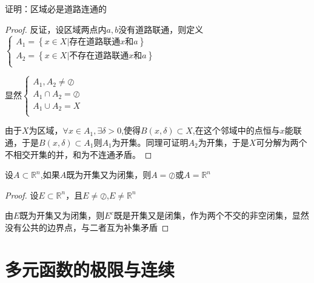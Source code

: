 \documentclass[lang=cn,10pt]{elegantbook}
\begin{document}
\begin{exercise}
	证明：区域必是道路连通的
\end{exercise}
\begin{proof}
	反证，设区域两点内$a,b$没有道路联通，则定义
	$\begin{cases}
		A_1=\left\{ x\in X|\text{存在道路联通}x\text{和}a \right\}\\
		A_2=\left\{ x\in X|\text{不存在道路联通}x\text{和}a \right\}\\
	\end{cases}$
	
	显然$\left\{ \begin{array}{c}
		A_1,A_2\ne \oslash\\
		A_1\cap A_2=\oslash\\
		A_1\cup A_2=X\\
	\end{array} \right. $
	
	由于$X$为区域，$\forall x \in A_{1},\exists \delta>0$,使得$B(x,\delta)\subset X$,在这个邻域中的点恒与$x$能联通，于是$B(x,\delta)\subset A_{1}$则$A_{1}$为开集。同理可证明$A_{2}$为开集，于是$X$可分解为两个不相交开集的并，和为不连通矛盾。
\end{proof}
\begin{exercise}
	设$A \subset \mathbb{R} ^n$,如果$A$既为开集又为闭集，则$A=\oslash$或$A=\mathbb{R} ^n$
\end{exercise}
\begin{proof}
	设$E \subset \mathbb{R} ^n$，且$E\ne\oslash$,$E\ne\mathbb{R} ^n$
	
	由$E$既为开集又为闭集，则$E^{c}$既是开集又是闭集，作为两个不交的非空闭集，显然没有公共的边界点，与二者互为补集矛盾
\end{proof}
\chapter{多元函数的极限与连续}
\end{document}
